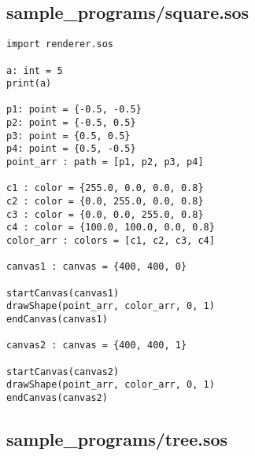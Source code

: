 \documentclass[main.tex]{subfiles}
\begin{document}
\subsection{sample\_programs/square.sos}
\begin{lstlisting}
import renderer.sos

a: int = 5 
print(a)

p1: point = {-0.5, -0.5}
p2: point = {-0.5, 0.5}
p3: point = {0.5, 0.5}
p4: point = {0.5, -0.5}
point_arr : path = [p1, p2, p3, p4] 

c1 : color = {255.0, 0.0, 0.0, 0.8}
c2 : color = {0.0, 255.0, 0.0, 0.8}
c3 : color = {0.0, 0.0, 255.0, 0.8}
c4 : color = {100.0, 100.0, 0.0, 0.8}
color_arr : colors = [c1, c2, c3, c4] 

canvas1 : canvas = {400, 400, 0}

startCanvas(canvas1)
drawShape(point_arr, color_arr, 0, 1)
endCanvas(canvas1)

canvas2 : canvas = {400, 400, 1}

startCanvas(canvas2)
drawShape(point_arr, color_arr, 0, 1)
endCanvas(canvas2)
\end{lstlisting}


\subsection{sample\_programs/tree.sos}
\end{document}
